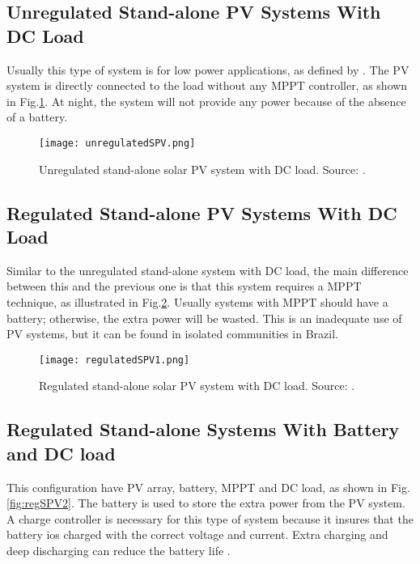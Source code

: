 \subsection{Unregulated Stand-alone PV Systems With DC Load }

Usually this type of system is for low power applications, as defined by \cite{Roy}. The PV system is directly connected to the load without any MPPT controller, as shown in Fig.\ref{fig:unregSPV}. At night, the system will not provide any power because of the absence of a battery. 
 
\begin{figure}[h]
\texttt{[image: unregulatedSPV.png]}
\centering
\caption{Unregulated stand-alone solar PV system with DC load. Source: \cite{Roy}.}
\label{fig:unregSPV}
\end{figure}

\subsection{Regulated Stand-alone PV Systems With DC Load}
Similar to the unregulated stand-alone system with DC load, the main difference between this and the previous one is that this system requires a MPPT technique, as illustrated in Fig.\ref{fig:regSPV1}. Usually systems with MPPT should have a battery; otherwise, the extra power will be wasted. This is an inadequate use of PV systems, but it can be found in isolated communities in Brazil.

\begin{figure}[h]
\texttt{[image: regulatedSPV1.png]}
\centering
\caption{Regulated stand-alone solar PV system with DC load. Source: \cite{Roy}.}
\label{fig:regSPV1}
\end{figure}

\subsection{Regulated Stand-alone Systems With Battery and DC load}

This configuration have PV array, battery, MPPT and DC load, as shown in Fig.\ref{fig:regSPV2}. The battery is used to store the extra power from the PV system. A charge controller is necessary for this type of system because it insures that the battery ios charged with the correct voltage and current. Extra charging and deep discharging can reduce the battery life \cite{Kim}. 


